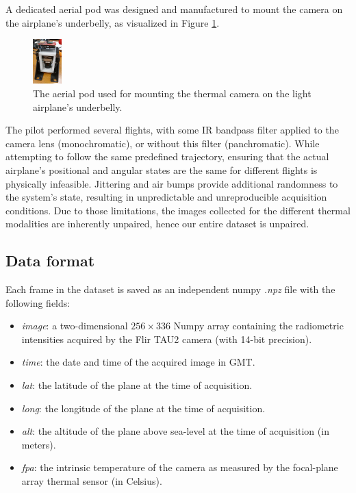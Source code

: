 \documentclass[10pt,twocolumn,letterpaper]{article}
\begin{document}
A dedicated aerial pod was designed and manufactured to mount the camera on the airplane's underbelly, as visualized in Figure \ref{fig:camera_jig}.
\begin{figure}[h]
    \centering
    \includegraphics[width=0.1\textwidth]{../figs/data/camera_jig_actual.jpeg}
    \caption{The aerial pod used for mounting the thermal camera on the light airplane's underbelly.}
    \label{fig:camera_jig}
\end{figure}

The pilot performed several flights, with some IR bandpass filter applied to the camera lens (monochromatic), or without this filter (panchromatic).
While attempting to follow the same predefined trajectory, ensuring that the actual airplane's positional and angular states are the same for different flights is physically infeasible.
Jittering and air bumps provide additional randomness to the system's state, resulting in unpredictable and unreproducible acquisition conditions.
Due to those limitations, the images collected for the different thermal modalities are inherently unpaired, hence our entire dataset is unpaired.

\subsection{Data format}
Each frame in the dataset is saved as an independent numpy \emph{.npz} file with the following fields:
\begin{itemize}
    \item \emph{image}: a two-dimensional $256 \times 336$ Numpy array containing the radiometric intensities acquired by the Flir TAU2 camera (with 14-bit precision).
    \item \emph{time}: the date and time of the acquired image in GMT.
    \item \emph{lat}: the latitude of the plane at the time of acquisition. 
    \item \emph{long}: the longitude of the plane at the time of acquisition. 
    \item \emph{alt}: the altitude of the plane above sea-level at the time of acquisition (in meters).
    \item \emph{fpa}: the intrinsic temperature of the camera as measured by the focal-plane array thermal sensor (in Celsius).
\end{itemize}
\end{document}
